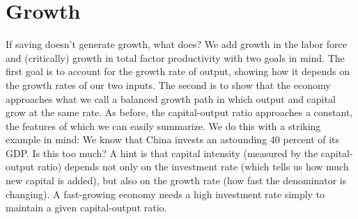 \section{Growth}

If saving doesn't generate growth, what does?
We add growth in the labor force and
(critically) growth in total factor productivity
with two goals in mind.
The first goal is to account for the growth rate of output,
showing how it depends on the growth rates of our two inputs.
The second is to show that the economy approaches
what we call a balanced growth path in which
output and capital grow at the same rate.
As before, the capital-output ratio approaches a constant,
the features of which we can easily summarize.
We do this with a striking example in mind:
We know that China invests an astounding 40 percent of its GDP.
Is this too much?
A hint is that capital intensity
(measured by the capital-output ratio)
depends not only on the investment rate (which tells us how
much new capital is added), but also on the growth rate
(how fast the denominator is changing).
A fast-growing economy needs a high investment rate
simply to maintain a given capital-output ratio.


